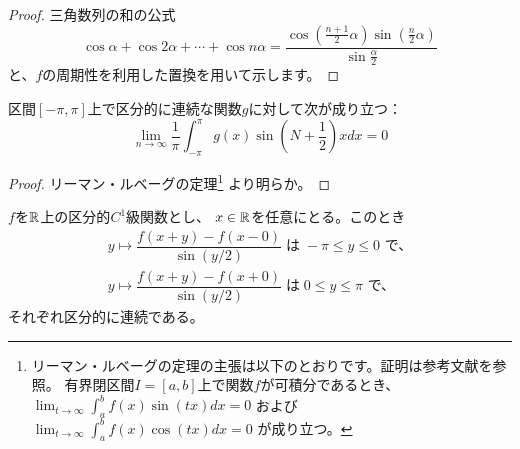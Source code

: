 \documentclass[report]{jlreq}
\begin{document}
\begin{proof}
    三角数列の和の公式
    \begin{equation}
        \cos\alpha + \cos 2\alpha + \cdots + \cos n\alpha
            = \frac{\cos\left(\frac{n+1}{2}\alpha\right) \sin\left(\frac{n}{2}\alpha\right)}{\sin\frac{\alpha}{2}}
    \end{equation}
    と、$f$の周期性を利用した置換を用いて示します。
\end{proof}

    \begin{lemma}
        区間$[-\pi, \pi]$上で区分的に連続な関数$g$に対して次が成り立つ：
        \begin{equation}
            \lim_{n\to\infty} \frac{1}{\pi} \int_{-\pi}^{\pi} g(x) \sin\left(N + \frac{1}{2}\right) x dx = 0
        \end{equation}
        \label{3:lemma2}
    \end{lemma}

\begin{proof}
    リーマン・ルベーグの定理\footnote{
        リーマン・ルベーグの定理の主張は以下のとおりです。証明は参考文献\cite[第3章 例題3.3]{杉浦+89}を参照。
        有界閉区間$I=[a,b]$上で関数$f$が可積分であるとき、
        $\lim_{t\to\infty} \int_a^b f(x) \sin(tx) dx = 0$
        および
        $\lim_{t\to\infty} \int_a^b f(x) \cos(tx) dx = 0$
        が成り立つ。
    }
    より明らか。
\end{proof}

\begin{lemma}
    $f$を$\mathbb{R}$上の区分的$C^1$級関数とし、
    $x \in \mathbb{R}$を任意にとる。このとき
    \begin{gather}
        y \mapsto \dfrac{f(x + y) - f(x - 0)}{\sin(y/2)}
            \;\text{は}\; -\pi \le y \le 0 \text{ で、} \label{eq:lem3:a} \\[+1em]
        y \mapsto \dfrac{f(x + y) - f(x + 0)}{\sin(y/2)}
            \;\text{は}\; 0 \le y \le \pi \text{ で、} \label{eq:lem3:b}
    \end{gather}
    それぞれ区分的に連続である。
    \label{3:lemma3}
\end{lemma}
\end{document}

